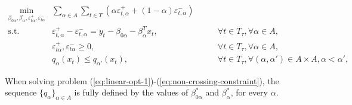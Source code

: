 \begin{eqnarray}
\label{eq:non-crossing-quantiles1}
\min_{\beta_{0\alpha},\beta_\alpha,\varepsilon_{t\alpha}^{+}, \varepsilon_{t\alpha}^{-}} &  \sum_{\alpha \in A} \sum_{t \in T}\left(\alpha \varepsilon_{t,\alpha}^{+}+(1-\alpha)\varepsilon_{t,\alpha}^{-}\right) & \label{eq:linear-opt-1} \\
\mbox{s.t. } & \varepsilon_{t,\alpha}^{+}-\varepsilon_{t,\alpha}^{-}=y_{t} - \beta_{0\alpha} - \beta_{\alpha}^T x_{t}, & \qquad\forall t \in T_\tau,\forall \alpha \in A,\\
& \varepsilon_{t\alpha}^+,\varepsilon_{t\alpha}^- \geq 0, & \qquad\forall t \in T_\tau,\forall \alpha \in A,\\ \label{eq:non-crossing-constraint}
& q_{\alpha}(x_t) \leq q_{\alpha'}(x_t), & \qquad \forall t \in T_\tau, \forall (\alpha, \alpha') \in A \times A,  \alpha < \alpha', 
\end{eqnarray}


When solving problem (\ref{eq:linear-opt-1})-(\ref{eq:non-crossing-constraint}), the sequence $\{ q_\alpha \}_{\alpha \in A}$ is fully defined by the values of $\beta^*_{0\alpha}$ and $\beta^*_\alpha$, for every $\alpha$.


